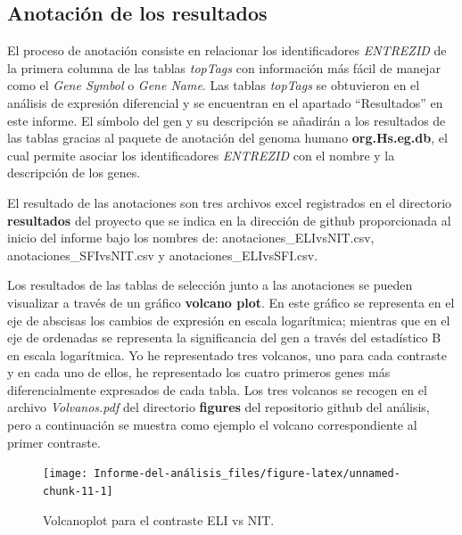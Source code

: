 \documentclass[]{article}
\begin{document}
\hypertarget{anotaciuxf3n-de-los-resultados}{%
\subsection{Anotación de los
resultados}\label{anotaciuxf3n-de-los-resultados}}

El proceso de anotación consiste en relacionar los identificadores
\emph{ENTREZID} de la primera columna de las tablas \emph{topTags} con
información más fácil de manejar como el \emph{Gene Symbol} o \emph{Gene
Name}. Las tablas \emph{topTags} se obtuvieron en el análisis de
expresión diferencial y se encuentran en el apartado ``Resultados'' en
este informe. El símbolo del gen y su descripción se añadirán a los
resultados de las tablas gracias al paquete de anotación del genoma
humano \textbf{org.Hs.eg.db}, el cual permite asociar los
identificadores \emph{ENTREZID} con el nombre y la descripción de los
genes.

El resultado de las anotaciones son tres archivos excel registrados en
el directorio \textbf{resultados} del proyecto que se indica en la
dirección de github proporcionada al inicio del informe bajo los nombres
de: anotaciones\_ELIvsNIT.csv, anotaciones\_SFIvsNIT.csv y
anotaciones\_ELIvsSFI.csv.

Los resultados de las tablas de selección junto a las anotaciones se
pueden visualizar a través de un gráfico \textbf{volcano plot}. En este
gráfico se representa en el eje de abscisas los cambios de expresión en
escala logarítmica; mientras que en el eje de ordenadas se representa la
significancia del gen a través del estadístico B en escala logarítmica.
Yo he representado tres volcanos, uno para cada contraste y en cada uno
de ellos, he representado los cuatro primeros genes más diferencialmente
expresados de cada tabla. Los tres volcanos se recogen en el archivo
\emph{Volvanos.pdf} del directorio \textbf{figures} del repositorio
github del análisis, pero a continuación se muestra como ejemplo el
volcano correspondiente al primer contraste.

\begin{figure}[H]

{\centering \texttt{[image: Informe-del-análisis\_files/figure-latex/unnamed-chunk-11-1]} 

}

\caption{Volcanoplot para el contraste ELI vs NIT.}\label{fig:unnamed-chunk-11}
\end{figure}
\end{document}
